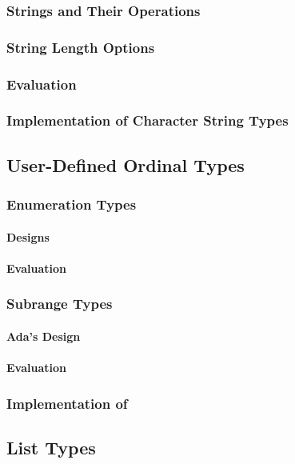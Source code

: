 \subsubsection{Strings and Their Operations}\label{subsubsec:String_Types_and_Ops}
\subsubsection{String Length Options}\label{subsubsec:String_Type_Length_Options}
\subsubsection{Evaluation}\label{subsubsec:String_Type_Evaluation}
\subsubsection{Implementation of Character String Types}\label{subsubsec:Implementation_of_Character_String_Types}

\subsection{User-Defined Ordinal Types}\label{subsec:User_Defined_Ordinal_Types}
\subsubsection{Enumeration Types}\label{subsubsec:Enumeration_Types}
\paragraph{Designs}\label{par:Enumeration_Types_Designs}
\paragraph{Evaluation}\label{par:Enumeration_Types_Evaluation}

\subsubsection{Subrange Types}\label{subsubsec:Subrange_Types}
\paragraph{Ada's Design}\label{par:Adas_Subrange_Types_Design}
\paragraph{Evaluation}\label{par:Subrange_Types_Evaluation}

\subsubsection{Implementation of }\label{subsubsec:Implementation_User_Defined_Ordinal_Types}

\subsection{List Types}\label{subsec:List_Types}


